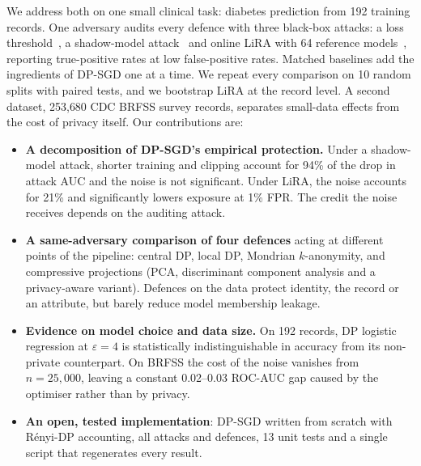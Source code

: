 \documentclass[conference]{IEEEtran}
\newcommand{\eps}{\varepsilon}
\begin{document}
We address both on one small clinical task: diabetes prediction from 192 training records. One adversary audits every defence with three black-box attacks: a loss threshold~\cite{yeom2018}, a shadow-model attack~\cite{shokri2017} and online LiRA with 64 reference models~\cite{carlini2022}, reporting true-positive rates at low false-positive rates. Matched baselines add the ingredients of DP-SGD one at a time. We repeat every comparison on 10 random splits with paired tests, and we bootstrap LiRA at the record level. A second dataset, 253{,}680 CDC BRFSS survey records, separates small-data effects from the cost of privacy itself. Our contributions are:
\begin{itemize}
\item \textbf{A decomposition of DP-SGD's empirical protection.} Under a shadow-model attack, shorter training and clipping account for 94\% of the drop in attack AUC and the noise is not significant. Under LiRA, the noise accounts for 21\% and significantly lowers exposure at 1\% FPR. The credit the noise receives depends on the auditing attack.
\item \textbf{A same-adversary comparison of four defences} acting at different points of the pipeline: central DP, local DP, Mondrian $k$-anonymity, and compressive projections (PCA, discriminant component analysis and a privacy-aware variant). Defences on the data protect identity, the record or an attribute, but barely reduce model membership leakage.
\item \textbf{Evidence on model choice and data size.} On 192 records, DP logistic regression at $\eps{=}4$ is statistically indistinguishable in accuracy from its non-private counterpart. On BRFSS the cost of the noise vanishes from $n{=}25{,}000$, leaving a constant 0.02--0.03 ROC-AUC gap caused by the optimiser rather than by privacy.
\item \textbf{An open, tested implementation}: DP-SGD written from scratch with R\'enyi-DP accounting, all attacks and defences, 13 unit tests and a single script that regenerates every result.
\end{itemize}
\end{document}
